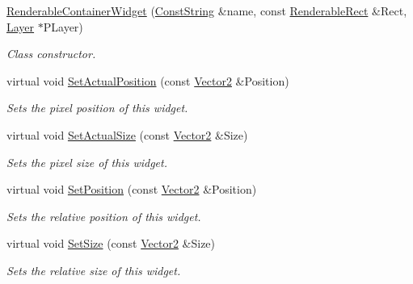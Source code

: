 \begin{DoxyCompactItemize}
\hyperlink{classMezzanine_1_1UI_1_1RenderableContainerWidget_adc5f635cdb48dad33934ff82df3c61f9}{RenderableContainerWidget} (\hyperlink{namespaceMezzanine_a63cd699ac54b73953f35ec9cfc05e506}{ConstString} \&name, const \hyperlink{structMezzanine_1_1UI_1_1RenderableRect}{RenderableRect} \&Rect, \hyperlink{classMezzanine_1_1UI_1_1Layer}{Layer} $\ast$PLayer)
\begin{DoxyCompactList}\small\item\em Class constructor. \item\end{DoxyCompactList}\item 
virtual void \hyperlink{classMezzanine_1_1UI_1_1RenderableContainerWidget_a40f37509c36c3d131cfa8a29db49fd1d}{SetActualPosition} (const \hyperlink{classMezzanine_1_1Vector2}{Vector2} \&Position)
\begin{DoxyCompactList}\small\item\em Sets the pixel position of this widget. \item\end{DoxyCompactList}\item 
virtual void \hyperlink{classMezzanine_1_1UI_1_1RenderableContainerWidget_a036b474eb0d08197ee5130954a1ea992}{SetActualSize} (const \hyperlink{classMezzanine_1_1Vector2}{Vector2} \&Size)
\begin{DoxyCompactList}\small\item\em Sets the pixel size of this widget. \item\end{DoxyCompactList}\item 
virtual void \hyperlink{classMezzanine_1_1UI_1_1RenderableContainerWidget_a169f11799bf2f3642ddfae70832dff59}{SetPosition} (const \hyperlink{classMezzanine_1_1Vector2}{Vector2} \&Position)
\begin{DoxyCompactList}\small\item\em Sets the relative position of this widget. \item\end{DoxyCompactList}\item 
virtual void \hyperlink{classMezzanine_1_1UI_1_1RenderableContainerWidget_a672008c2b0340b36ca3041b858b570bc}{SetSize} (const \hyperlink{classMezzanine_1_1Vector2}{Vector2} \&Size)
\begin{DoxyCompactList}\small\item\em Sets the relative size of this widget. \item\end{DoxyCompactList}\item 

\end{DoxyCompactItemize}
